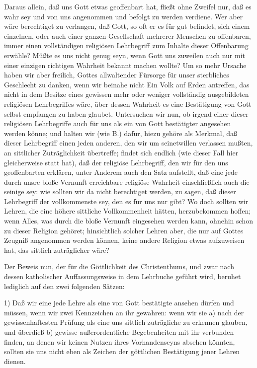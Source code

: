 Daraus allein, daß uns Gott etwas geoffenbart hat, fließt ohne Zweifel nur, daß es wahr sey und von uns angenommen und befolgt zu werden verdiene. Wer aber wäre berechtiget zu verlangen, daß Gott, so oft er es für gut befindet, sich einem einzelnen, oder auch einer ganzen Gesellschaft mehrerer Menschen zu offenbaren, immer einen vollständigen religiösen Lehrbegriff zum Inhalte dieser Offenbarung erwähle? Müßte es uns nicht genug seyn, wenn Gott uns zuweilen auch nur mit einer einzigen richtigen Wahrheit bekannt machen wollte? Um so mehr Ursache haben wir aber freilich, Gottes allwaltender Fürsorge für unser sterbliches Geschlecht zu danken, wenn wir beinahe nicht Ein Volk auf Erden antreffen, das nicht in dem Besitze eines gewissen mehr oder weniger vollständig ausgebildeten religiösen Lehrbegriffes wäre, über dessen Wahrheit es eine Bestätigung von Gott selbst empfangen zu haben glaubet. Untersuchen wir nun, ob irgend einer dieser religiösen Lehrbegriffe auch für uns als ein von Gott bestätigter angesehen werden könne; und halten wir (wie B.) dafür, hiezu gehöre als Merkmal, daß dieser Lehrbegriff einen jeden anderen, den wir um seinetwillen verlassen mußten, an sittlicher Zuträglichkeit übertreffe; findet sich endlich (wie dieser Fall hier gleicherweise statt hat), daß der religiöse Lehrbegriff, den wir für den uns geoffenbarten erklären, unter Anderem auch den Satz aufstellt, daß eine jede durch unsre bloße Vernunft erreichbare religiöse Wahrheit einschließlich auch  die seinige sey: wie sollten wir da nicht berechtiget werden, zu sagen, daß dieser Lehrbegriff der vollkommenste sey, den es für uns nur gibt? Wo doch sollten wir Lehren, die eine höhere sittliche Vollkommenheit hätten, herzubekommen hoffen; wenn Alles, was durch die bloße Vernunft eingesehen werden kann, ohnehin schon zu dieser Religion gehöret; hinsichtlich solcher Lehren aber, die nur auf Gottes Zeugniß angenommen werden können, keine andere Religion etwas aufzuweisen hat, das sittlich zuträglicher wäre? \par 
Der Beweis nun, der für die Göttlichkeit des Christenthums, und zwar nach dessen katholischer Auffassungsweise in dem Lehrbuche geführt wird, beruhet lediglich auf den zwei folgenden Sätzen: \par 
1) Daß wir eine jede Lehre als eine von Gott bestätigte ansehen dürfen und müssen, wenn wir zwei Kennzeichen an ihr gewahren: wenn wir sie a) nach der gewissenhaftesten Prüfung als eine uns sittlich zuträgliche zu erkennen glauben, und überdieß b) gewisse außerordentliche Begebenheiten mit ihr verbunden finden, an denen wir keinen Nutzen ihres Vorhandenseyns absehen könnten, sollten sie uns nicht eben als Zeichen der göttlichen Bestätigung jener Lehren dienen. \par 
